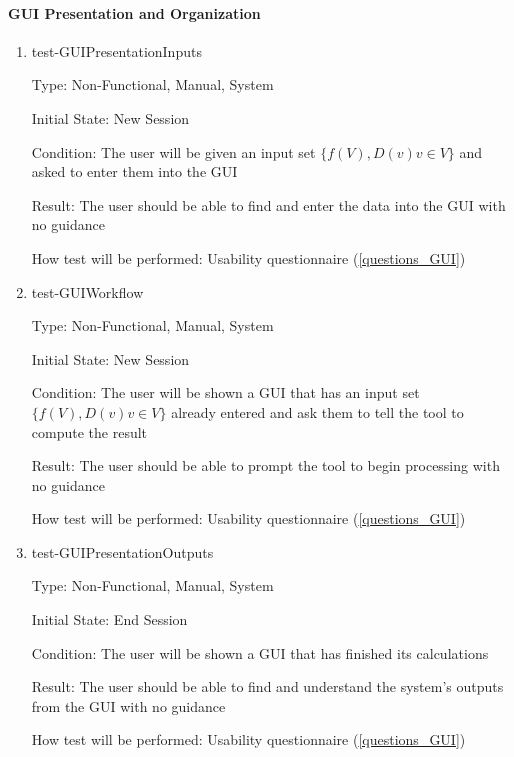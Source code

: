 \documentclass[12pt, titlepage]{article}
\begin{document}
\paragraph{GUI Presentation and Organization}

\begin{enumerate}
	
	\item{test-GUIPresentationInputs}
	
	Type: Non-Functional, Manual, System
	
	Initial State: New Session
	
	Condition: The user will be given an input set $\{f(V), D(v) v \in V\}$ and 
	asked to enter them into the GUI
	
	Result: The user should be able to find and enter the data into the GUI 
	with no guidance
	
	How test will be performed: Usability questionnaire (\ref{questions_GUI})\\
	
	\item{test-GUIWorkflow}
	
	Type: Non-Functional, Manual, System
	
	Initial State: New Session
	
	Condition: The user will be shown a GUI that has an input set $\{f(V), D(v) 
	v \in V\}$ already entered and ask them to tell the tool to compute the 
	result
	
	Result: The user should be able to prompt the tool to begin processing with 
	no guidance
	
	How test will be performed: Usability questionnaire (\ref{questions_GUI})\\
	
	\item{test-GUIPresentationOutputs}
	
	Type: Non-Functional, Manual, System
	
	Initial State: End Session
	
	Condition: The user will be shown a GUI that has finished its calculations
	
	Result: The user should be able to find and understand the system's outputs 
	from the GUI with no guidance
	
	How test will be performed: Usability questionnaire (\ref{questions_GUI})\\
	
\end{enumerate}
\end{document}
